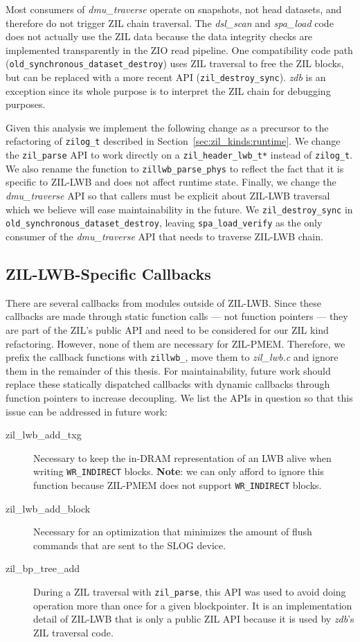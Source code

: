 \documentclass[12pt,a4paper,twoside]{book}
\begin{document}
Most consumers of \textit{dmu\_traverse} operate on snapshots, not head datasets, and therefore do not trigger ZIL chain traversal.
The \textit{dsl\_scan} and \textit{spa\_load} code does not actually use the ZIL data because the data integrity checks are implemented transparently in the ZIO read pipeline.
One compatibility code path (\lstinline{old_synchronous_dataset_destroy}) uses ZIL traversal to free the ZIL blocks, but can be replaced with a more recent API (\lstinline{zil_destroy_sync}).
\textit{zdb} is an exception since its whole purpose is to interpret the ZIL chain for debugging purposes.

Given this analysis we implement the following change as a precursor to the refactoring of \lstinline{zilog_t} described in Section~\ref{sec:zil_kinds:runtime}.
We change the \lstinline{zil_parse} API to work directly on a \lstinline{zil_header_lwb_t*} instead of \lstinline{zilog_t}.
We also rename the function to \lstinline{zillwb_parse_phys} to reflect the fact that it is specific to ZIL-LWB and does not affect runtime state.
Finally, we change the \textit{dmu\_traverse} API so that callers must be explicit about ZIL-LWB traversal which we believe will ease maintainability in the future.
We \lstinline{zil_destroy_sync} in \lstinline{old_synchronous_dataset_destroy}, leaving \lstinline{spa_load_verify} as the only consumer of the \textit{dmu\_traverse} API that needs to traverse ZIL-LWB chain.


\subsection{ZIL-LWB-Specific Callbacks}\label{sec:zil_kinds:callbacks}
There are several callbacks from modules outside of ZIL-LWB.
Since these callbacks are made through static function calls --- not function pointers --- they are part of the ZIL's public API and need to be considered for our ZIL kind refactoring.
However, none of them are necessary for ZIL-PMEM.
Therefore, we prefix the callback functions with \lstinline{zillwb_}, move them to \textit{zil\_lwb.c} and ignore them in the remainder of this thesis.
For maintainability, future work should replace these statically dispatched callbacks with dynamic callbacks through function pointers to increase decoupling.
We list the APIs in question so that this issue can be addressed in future work:
\begin{description}
    \item[zil\_lwb\_add\_txg] Necessary to keep the in-DRAM representation of an LWB alive when writing \lstinline{WR_INDIRECT} blocks.
    \textbf{Note}: we can only afford to ignore this function because ZIL-PMEM does not support \lstinline{WR_INDIRECT} blocks.
    \item[zil\_lwb\_add\_block] Necessary for an optimization that minimizes the amount of flush commands that are sent to the SLOG device.
    \item[zil\_bp\_tree\_add] During a ZIL traversal with \lstinline{zil_parse}, this API was used to avoid doing operation more than once for a given blockpointer.
        It is an implementation detail of ZIL-LWB that is only a public ZIL API because it is used by \textit{zdb}'s ZIL traversal code.
\end{description}
\end{document}
